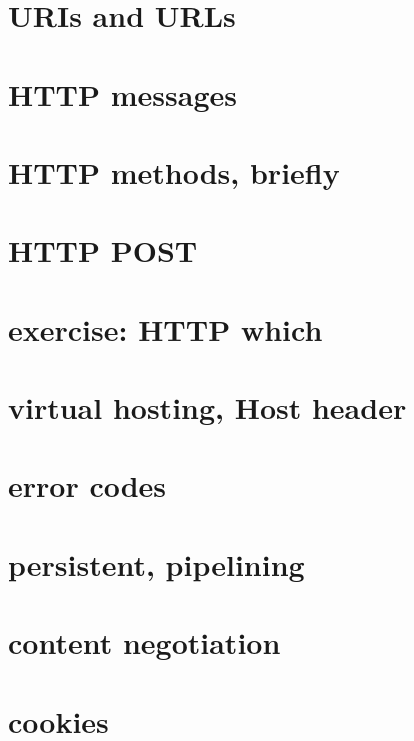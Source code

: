 \date{}
\title{}
\date{}

\begin{frame}
    \titlepage
\end{frame}

\section{URIs and URLs}


\section{HTTP messages}


\section{HTTP methods, briefly}


\section{HTTP POST}


\section{exercise: HTTP which}


\section{virtual hosting, Host header}


\section{error codes}


\section{persistent, pipelining}


\section{content negotiation}


\section{cookies}



